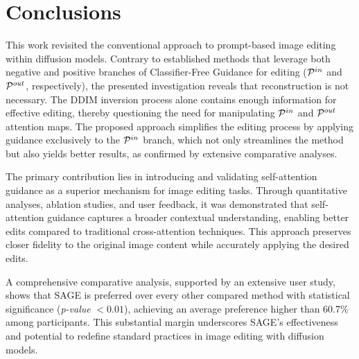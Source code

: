 \section{Conclusions}

{\modified{}This work revisited} the conventional approach to prompt-based image editing within diffusion models. Contrary to established methods that leverage both negative and positive branches of Classifier-Free Guidance for editing (${{\mathcal{P}}^{in}}$ and ${{\mathcal{P}}^{out}}$, respectively), {\modified{}the presented investigation reveals} that reconstruction is not necessary. {\modified{}The DDIM inversion process alone contains} enough information for effective editing, thereby questioning the need for manipulating ${{\mathcal{P}}^{in}}$ and ${{\mathcal{P}}^{out}}$ attention maps. {\modified{}The proposed approach simplifies} the editing process by applying guidance exclusively to the ${{\mathcal{P}}^{in}}$ branch, which not only streamlines the method but also yields better results, as confirmed by extensive comparative analyses.


{\modified{}The primary contribution lies} in introducing and validating self-attention guidance as a superior mechanism for image editing tasks. Through quantitative analyses, ablation studies, and user feedback, {\modified{}it was demonstrated} that self-attention guidance captures a broader contextual understanding, enabling better edits compared to traditional cross-attention techniques. This approach preserves closer fidelity to the original image content while accurately applying the desired edits. 

{\modified{}A comprehensive comparative analysis}, supported by an extensive user study, shows that SAGE is preferred over every other compared method with statistical significance (\textit{p-value} $< 0.01$), achieving an average preference higher than 60.7\% among participants. This substantial margin underscores SAGE's effectiveness and potential to redefine standard practices in image editing with diffusion models.



